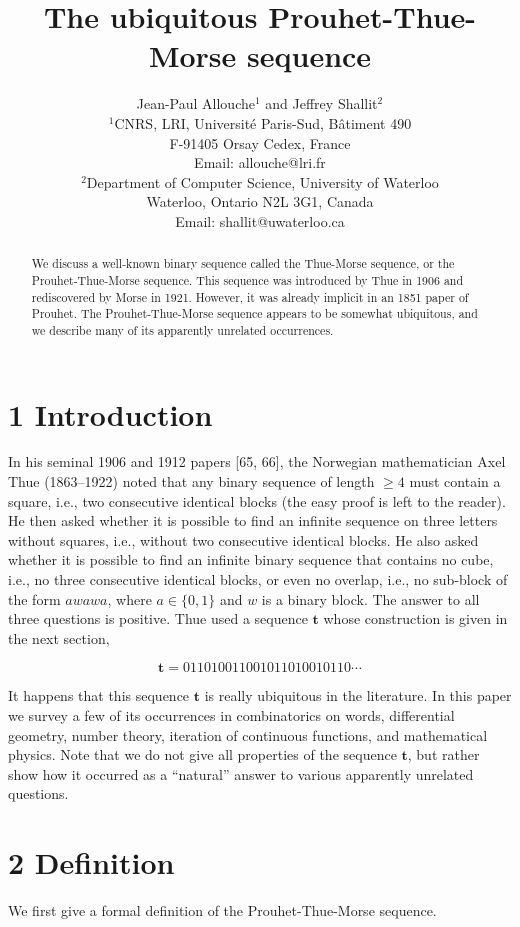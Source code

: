 \documentclass[10pt]{article}
\title{The ubiquitous Prouhet-Thue-Morse sequence}
\author{Jean-Paul Allouche$^{1}$ and Jeffrey Shallit$^{2}$\\
$^{1}$CNRS, LRI, Université Paris-Sud, Bâtiment 490\\
F-91405 Orsay Cedex, France\\
Email: allouche@lri.fr\\
$^{2}$Department of Computer Science, University of Waterloo\\
Waterloo, Ontario N2L 3G1, Canada\\
Email: shallit@uwaterloo.ca}
\date{}
\begin{document}
\maketitle


\begin{abstract}
We discuss a well-known binary sequence called the Thue-Morse sequence, or the Prouhet-Thue-Morse sequence. This sequence was introduced by Thue in 1906 and rediscovered by Morse in 1921. However, it was already implicit in an 1851 paper of Prouhet. The Prouhet-Thue-Morse sequence appears to be somewhat ubiquitous, and we describe many of its apparently unrelated occurrences.
\end{abstract}

\section*{1 Introduction}
In his seminal 1906 and 1912 papers [65, 66], the Norwegian mathematician Axel Thue (1863--1922) noted that any binary sequence of length $\geq 4$ must contain a square, i.e., two consecutive identical blocks (the easy proof is left to the reader). He then asked whether it is possible to find an infinite sequence on three letters without squares, i.e., without two consecutive identical blocks. He also asked whether it is possible to find an infinite binary sequence that contains no cube, i.e., no three consecutive identical blocks, or even no overlap, i.e., no sub-block of the form $awawa$, where $a \in\{0,1\}$ and $w$ is a binary block. The answer to all three questions is positive. Thue used a sequence $\mathbf{t}$ whose construction is given in the next section,

\[
\mathbf{t}=011010011001011010010110\cdots
\]

It happens that this sequence $\mathbf{t}$ is really ubiquitous in the literature. In this paper we survey a few of its occurrences in combinatorics on words, differential geometry, number theory, iteration of continuous functions, and mathematical physics. Note that we do not give all properties of the sequence $\mathbf{t}$, but rather show how it occurred as a ``natural'' answer to various apparently unrelated questions.

\section*{2 Definition}
We first give a formal definition of the Prouhet-Thue-Morse sequence.
\end{document}
